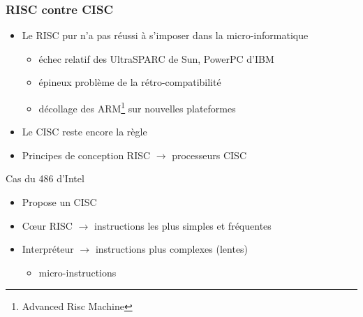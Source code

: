 \begin{frame}
\frametitle{RISC contre CISC}
\begin{itemize}
\item Le RISC pur n'a pas réussi à s'imposer dans la micro-informatique
\begin{itemize}
\item échec relatif des UltraSPARC de Sun, PowerPC d'IBM
\item épineux problème de la rétro-compatibilité
\item décollage des ARM\footnote{Advanced Risc Machine} sur nouvelles plateformes
\end{itemize}
\item Le CISC reste encore la règle
\item Principes de conception RISC $\rightarrow$ processeurs CISC
\end{itemize}
\begin{exampleblock}{Cas du 486 d'Intel \cite{wp-apix86}}
\begin{itemize}
\item Propose un CISC
\item Cœur RISC $\rightarrow$  instructions les plus simples et fréquentes
\item Interpréteur $\rightarrow$ instructions plus complexes (lentes)
\begin{itemize}
\item micro-instructions
\end{itemize}
\end{itemize}
\end{exampleblock}
\end{frame}

